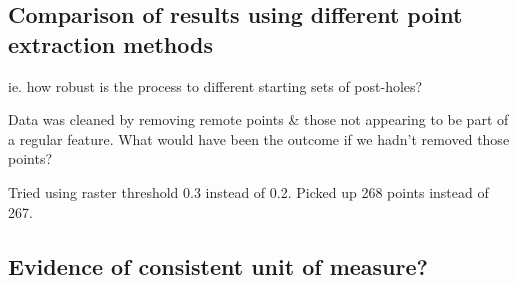 \documentclass[../../ArchStats.tex]{subfiles}
\begin{document}
\subsection{Comparison of results using different point extraction methods}
ie. how robust is the process to different starting sets of post-holes?

Data was cleaned by removing remote points \& those not appearing to be part of a regular feature. What would have been the outcome if we hadn't removed those points?


Tried using raster threshold 0.3 instead of 0.2. Picked up 268 points instead of 267.

\subsection{Evidence of consistent unit of measure?}
\end{document}
